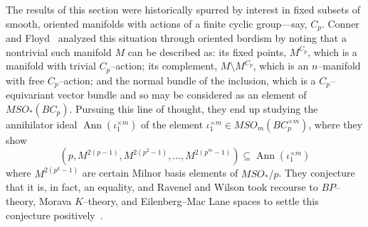 \begin{remark}
The results of this section were historically spurred by interest in fixed subsets of smooth, oriented manifolds with actions of a finite cyclic group---say, \(C_p\).
Conner and Floyd~\cite{ConnerFloydBook} analyzed this situation through oriented bordism by noting that a nontrivial such manifold \(M\) can be described as: its fixed points, \(M^{C_p}\), which is a manifold with trivial \(C_p\)--action; its complement, \(M \setminus M^{C_p}\), which is an \(n\)--manifold with free \(C_p\)--action; and the normal bundle of the inclusion, which is a \(C_p\)--equivariant vector bundle and so may be considered as an element of \(MSO_*(BC_p)\).
Pursuing this line of thought, they end up studying the annihilator ideal $\operatorname{Ann}(\iota_1^{\times m})$ of the element $\iota_1^{\times m} \in MSO_m(BC_p^{\times m})$, where they show \[(p, M^{2(p-1)}, M^{2(p^2-1)}, \ldots, M^{2(p^m-1)}) \subseteq \operatorname{Ann}(\iota_1^{\times m})\] where $M^{2(p^k-1)}$ are certain Milnor basis elements of $MSO_* / p $.
They conjecture that it is, in fact, an equality, and Ravenel and Wilson took recourse to \(BP\)--theory, Morava \(K\)--theory, and Eilenberg--Mac Lane spaces to settle this conjecture positively~\cite[Section 10]{RavenelWilsonKthyOfEMSpaces}.
\end{remark}










